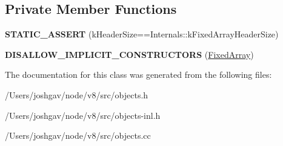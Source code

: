 \subsection*{Private Member Functions}
\begin{DoxyCompactItemize}
\item 
{\bfseries S\+T\+A\+T\+I\+C\+\_\+\+A\+S\+S\+E\+RT} (k\+Header\+Size==Internals\+::k\+Fixed\+Array\+Header\+Size)\hypertarget{classv8_1_1internal_1_1_fixed_array_ab19902d57c7dfbc7e40df4c444a3e7a2}{}\label{classv8_1_1internal_1_1_fixed_array_ab19902d57c7dfbc7e40df4c444a3e7a2}

\item 
{\bfseries D\+I\+S\+A\+L\+L\+O\+W\+\_\+\+I\+M\+P\+L\+I\+C\+I\+T\+\_\+\+C\+O\+N\+S\+T\+R\+U\+C\+T\+O\+RS} (\hyperlink{classv8_1_1internal_1_1_fixed_array}{Fixed\+Array})\hypertarget{classv8_1_1internal_1_1_fixed_array_a49db6bd5ab6caf12b1aa06f316f97651}{}\label{classv8_1_1internal_1_1_fixed_array_a49db6bd5ab6caf12b1aa06f316f97651}

\end{DoxyCompactItemize}


The documentation for this class was generated from the following files\+:\begin{DoxyCompactItemize}
\item 
/\+Users/joshgav/node/v8/src/objects.\+h\item 
/\+Users/joshgav/node/v8/src/objects-\/inl.\+h\item 
/\+Users/joshgav/node/v8/src/objects.\+cc\end{DoxyCompactItemize}
